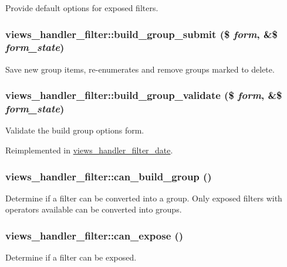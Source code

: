 \label{classviews__handler__filter_a632cefd4a30b2fb929cdaeefd945eb98}
Provide default options for exposed filters. \hypertarget{classviews__handler__filter_a0ddaf64d794c4d54d0e3fcc29265d791}{
\subsubsection[{build\_\-group\_\-submit}]{\setlength{\rightskip}{0pt plus 5cm}views\_\-handler\_\-filter::build\_\-group\_\-submit (\$ {\em form}, \/  \&\$ {\em form\_\-state})}}
\label{classviews__handler__filter_a0ddaf64d794c4d54d0e3fcc29265d791}
Save new group items, re-\/enumerates and remove groups marked to delete. \hypertarget{classviews__handler__filter_a301d05b76bbcfcf5e45cc2e802714759}{
\subsubsection[{build\_\-group\_\-validate}]{\setlength{\rightskip}{0pt plus 5cm}views\_\-handler\_\-filter::build\_\-group\_\-validate (\$ {\em form}, \/  \&\$ {\em form\_\-state})}}
\label{classviews__handler__filter_a301d05b76bbcfcf5e45cc2e802714759}
Validate the build group options form. 

Reimplemented in \hyperlink{classviews__handler__filter__date_aa5ba23cd2f32402635c1fca175cfaa01}{views\_\-handler\_\-filter\_\-date}.\hypertarget{classviews__handler__filter_a0cf3ce8c3731939c5fffa1c9d77381a1}{
\subsubsection[{can\_\-build\_\-group}]{\setlength{\rightskip}{0pt plus 5cm}views\_\-handler\_\-filter::can\_\-build\_\-group ()}}
\label{classviews__handler__filter_a0cf3ce8c3731939c5fffa1c9d77381a1}
Determine if a filter can be converted into a group. Only exposed filters with operators available can be converted into groups. \hypertarget{classviews__handler__filter_af0e5810a2a2f194cd6af0fca9c858756}{
\subsubsection[{can\_\-expose}]{\setlength{\rightskip}{0pt plus 5cm}views\_\-handler\_\-filter::can\_\-expose ()}}
\label{classviews__handler__filter_af0e5810a2a2f194cd6af0fca9c858756}
Determine if a filter can be exposed. 

